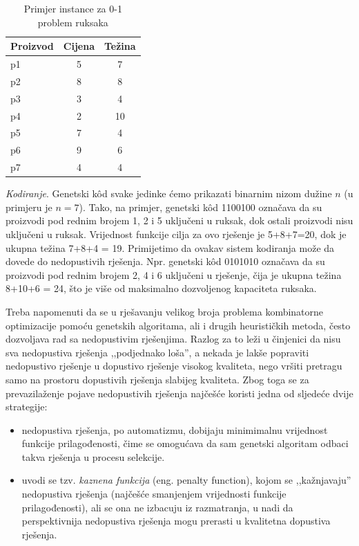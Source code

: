 \documentclass[b5paper, utf8, 11pt, colorlinks]{book}
\theoremstyle{definition}
\begin{document}
\begin{table}\begin{center}
	\begin{tabular}{lcc}\hline
		Proizvod&Cijena&Težina\\ \hline
		p1&5&7\\
		p2&8&8\\
		p3&3&4\\
		p4&2&10\\
		p5&7&4\\
		p6&9&6\\
		p7&4&4\\\hline
		\end{tabular}
	\end{center}\caption{Primjer instance za 0-1 problem ruksaka}\label{tbl:01ruksak}
\end{table} 

\emph{Kodiranje}. Genetski k\^od svake jedinke ćemo prikazati binarnim nizom dužine $n$ (u primjeru je $n=7$). Tako, na primjer, genetski k\^od 1100100 označava da su proizvodi pod rednim brojem 1, 2 i 5 uključeni u ruksak, dok ostali proizvodi nisu uključeni u ruksak. Vrijednost funkcije cilja za ovo rješenje je 5+8+7=20, dok je ukupna težina 7+8+4 = 19. 
Primijetimo da ovakav sistem kodiranja može da dovede do nedopustivih rješenja. Npr. genetski k\^od 0101010 označava da su proizvodi pod rednim brojem 2, 4 i 6 uključeni u rješenje, čija je ukupna težina 8+10+6 = 24, što je više od maksimalno dozvoljenog kapaciteta ruksaka.

Treba napomenuti da se u rješavanju velikog broja problema kombinatorne optimizacije pomoću genetskih algoritama, ali i drugih heurističkih metoda, često dozvoljava rad sa nedopustivim rješenjima. Razlog za to leži u činjenici da nisu sva nedopustiva rješenja ,,podjednako loša'', a nekada je lakše popraviti nedopustivo rješenje u dopustivo rješenje visokog kvaliteta, nego vršiti pretragu samo na prostoru dopustivih rješenja slabijeg kvaliteta.  Zbog toga se za prevazilaženje pojave nedopustivih rješenja najčešće koristi jedna od sljedeće dvije strategije: 
\begin{itemize}
	\item
	nedopustiva rješenja, po automatizmu, dobijaju minimimalnu vrijednost funkcije prilagođenosti, čime se omogućava da sam genetski algoritam odbaci takva rješenja u procesu selekcije. 
	
	\item uvodi se tzv. \textit{kaznena funkcija}  (eng. penalty function), kojom se ,,kažnjavaju'' nedopustiva rješenja (najčešće smanjenjem vrijednosti funkcije prilagođenosti), ali se ona ne izbacuju iz razmatranja, u nadi da perspektivnija nedopustiva rješenja mogu prerasti u kvalitetna dopustiva rješenja.
\end{itemize}
\end{document}

